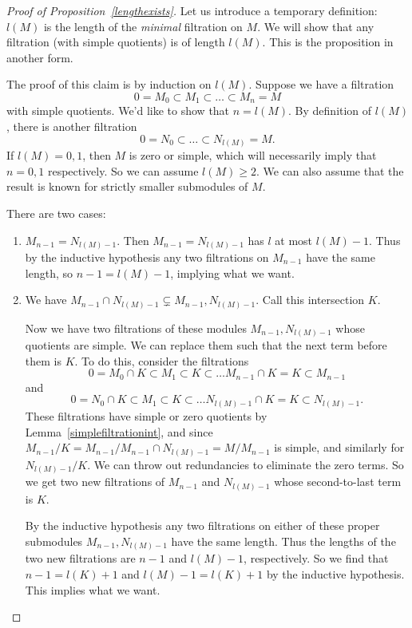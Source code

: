 \begin{proof}[Proof of Proposition~\ref{lengthexists}] 
Let us introduce a temporary definition: $l(M)$ is the length of the
\emph{minimal} filtration on $M$. We will show that any filtration (with
simple quotients) is of length
$l(M)$. This is the proposition in another form.

The proof of this claim is by induction on $l(M)$. Suppose we have a filtration
\[ 0 = M_0 \subset M_1 \subset \dots \subset M_n = M  \]
with simple quotients. We'd like to show that $n  = l(M)$. By definition of
$l(M)$, there is another filtration
\[ 0 = N_0 \subset \dots \subset N_{l(M)} = M.  \]
If $l(M) = 0,1$, then $M$ is zero or simple, which will necessarily imply that $n=0,1$
respectively. So we can assume $l(M)  \geq 2$. We can also assume that the
result is known for strictly smaller submodules of $M$.

There are two cases:
\begin{enumerate}
\item $M_{n-1} = N_{l(M) -1 } $. Then $M_{n-1} = N_{l(M)-1}$ has $l$ at most
$l(M)-1$. Thus by the inductive hypothesis any two filtrations on $M_{n-1}$
have the same length, so $n-1 = l(M) -1$, implying what we want. 
\item We have $M_{n-1} \cap N_{l(M) - 1} \subsetneq M_{n-1}, N_{l(M)-1}$. 
Call this intersection $K$. 

Now we have two  filtrations of these modules $M_{n-1}, N_{l(M)-1}$ whose
quotients are simple. We can replace them such that the next
term before them is $K$. 
To do this, consider the filtrations
\[ 0 = M_0 \cap K \subset M_1 \subset K \subset \dots M_{n-1} \cap K = K
\subset M_{n-1}  \]
and
\[ 0 = N_0 \cap K \subset M_1 \subset K \subset \dots N_{l(M)-1} \cap K = K
\subset N_{l(M)-1} . \]
These filtrations have simple or zero quotients by
Lemma~\ref{simplefiltrationint}, and since $ M_{n-1}/K =
M_{n-1}/M_{n-1} \cap N_{l(M)-1} = M/M_{n-1}$ is simple, and similarly for
$N_{l(M)-1}/K$. We can throw out redundancies to eliminate
the zero terms. 
So we get two new filtrations of $M_{n-1}$ and $N_{l(M)-1}$ whose second-to-last
term is $K$.

By the
inductive hypothesis any two filtrations on either of these proper submodules $M_{n-1},
N_{l(M)-1} $
have the same length. 
Thus the lengths of the two new filtrations are $n-1$ and $l(M)-1$,
respectively.
So we find that $n-1 = l(K) +1$ and $l(M)-1 = l(K)+1$ by
the inductive hypothesis. This implies what we want.
\end{enumerate}
\end{proof} 

